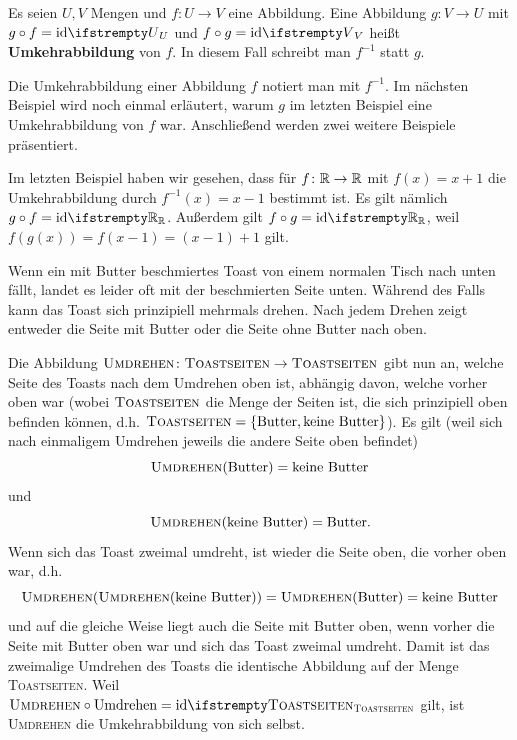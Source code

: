 \documentclass[../../main.tex]{subfiles}
\begin{document}
\begin{definition}[Umkehrabbildung]
    Es seien $U,V$ Mengen und $f\colon U\rightarrow V$ eine Abbildung. Eine Abbildung $g\colon V\rightarrow U$ mit $g\circ f=\ident[U]$ und $f\circ g=\ident[V]$ heißt \textbf{Umkehrabbildung} von $f$. In diesem Fall schreibt man $f^{-1}$ statt $g$.
\end{definition}

Die Umkehrabbildung einer Abbildung $f$ notiert man mit $f^{-1}$. Im nächsten Beispiel wird noch einmal erläutert, warum $g$ im letzten Beispiel eine Umkehrabbildung von $f$ war. Anschließend werden zwei weitere Beispiele präsentiert.

\begin{example}{}
    Im letzten Beispiel haben wir gesehen, dass für $f\colon\mathbb{R}\rightarrow\mathbb{R}$ mit $f(x)=x+1$ die Umkehrabbildung durch $f^{-1}(x)=x-1$ bestimmt ist. Es gilt nämlich $g\circ f=\ident[\Real]$. Außerdem gilt $f\circ g=\ident[\Real]$, weil $f(g(x))=f(x-1)=(x-1)+1$ gilt.
\end{example}

\begin{example}{}
    Wenn ein mit Butter beschmiertes Toast von einem normalen Tisch nach unten fällt, landet es leider oft mit der beschmierten Seite unten. Während des Falls kann das Toast sich prinzipiell mehrmals drehen. Nach jedem Drehen zeigt entweder die Seite mit Butter oder die Seite ohne Butter nach oben.
    
    Die Abbildung $\textsc{Umdrehen}\colon\textsc{Toastseiten}\rightarrow\textsc{Toastseiten}$ gibt nun an, welche Seite des Toasts nach dem Umdrehen oben ist, abhängig davon, welche vorher oben war (wobei $\textsc{Toastseiten}$ die Menge der Seiten ist, die sich prinzipiell oben befinden können, d.h. $\textsc{Toastseiten}=\{\text{Butter},\text{keine Butter}\}$). Es gilt (weil sich nach einmaligem Umdrehen jeweils die andere Seite oben befindet)
    \[\textsc{Umdrehen}(\text{Butter})=\text{keine Butter}\] und \[\textsc{Umdrehen}(\text{keine Butter})=\text{Butter}.\]
    Wenn sich das Toast zweimal umdreht, ist wieder die Seite oben, die vorher oben war, d.h. \[\textsc{Umdrehen}(\textsc{Umdrehen}(\text{keine Butter}))=\textsc{Umdrehen}(\text{Butter})=\text{keine Butter}\]
    und auf die gleiche Weise liegt auch die Seite mit Butter oben, wenn vorher die Seite mit Butter oben war und sich das Toast zweimal umdreht. Damit ist das zweimalige Umdrehen des Toasts die identische Abbildung auf der Menge \textsc{Toastseiten}. Weil $\textsc{Umdrehen}\circ \text{Umdrehen}=\ident[\textsc{Toastseiten}]$ gilt, ist \textsc{Umdrehen} die Umkehrabbildung von sich selbst.
\end{example}
\end{document}
